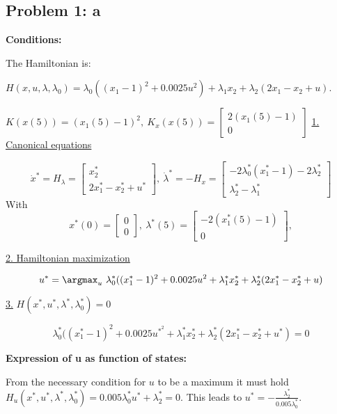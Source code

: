 \subsection{Problem 1: a}

\textbf{Conditions:}

The Hamiltonian is: 

$H(x, u, \lambda, \lambda_0) = \lambda_0 ((x_1 - 1)^2 + 0.0025u^2) + \lambda_1 x_2 + \lambda_2 (2x_1 - x_2 + u)$.

$K(x(5)) = (x_1(5) - 1)^2, \ K_x(x(5)) = \begin{bmatrix}
	2(x_1(5) - 1) \\
	0
\end{bmatrix}$
\underline{1. Canonical equations}

\[
	\dot{x}^* = H_{\lambda} = \begin{bmatrix}
		x_2^* \\
		2x_1^* - x_2^* + u^*
	\end{bmatrix}, \
	\dot{\lambda}^* = -H_{x} = \begin{bmatrix}
		-2\lambda_0^*(x_1^* - 1) - 2\lambda_2^* \\
		\lambda_2^* - \lambda_1^*
	\end{bmatrix}
\]
With 
\[
	x^*(0) = \begin{bmatrix}
		0 \\
		0 
	\end{bmatrix}, \
	\lambda^*(5) = \begin{bmatrix}
		-2(x_1^*(5) - 1) \\
		0 
	\end{bmatrix},
\]

\underline{2. Hamiltonian maximization}

\[
	u^* = \argmax_u \ \lambda_0^* ((x_1^* - 1)^2 + 0.0025u^2 + \lambda_1^* x_2^* + \lambda_2^* (2x_1^* - x_2^* + u)
\]

\underline{3.} $H(x^*, u^*, \lambda^*, \lambda_0^*) = 0$

\[
	\lambda_0^* ((x_1^* - 1)^2 + 0.0025u^{*^2} + \lambda_1^* x_2^* + \lambda_2^* (2x_1^* - x_2^* + u^*) = 0 
\]

\textbf{Expression of u as function of states:}

From the necessary condition for $u$ to be a maximum it must hold
$H_u(x^*, u^*, \lambda^*, \lambda_0^*) = 0.005\lambda_0^* u^* + \lambda_2^* = 0$. This leads to $u^* = -\frac{\lambda_2^*}{0.005\lambda_0^*}$.
